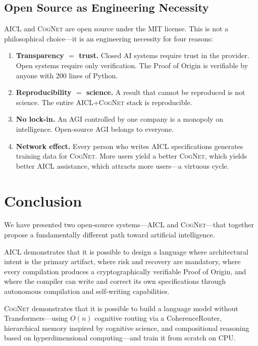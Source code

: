 \documentclass[11pt]{article}
\newcommand{\aicl}{\textsc{AICL}}
\newcommand{\cognet}{\textsc{CogNet}}
\newcommand{\proofoforigin}{Proof of Origin}
\begin{document}
\subsection{Open Source as Engineering Necessity}
\label{sec:discussion:opensource}

\aicl{} and \cognet{} are open source under the MIT license. This is not a philosophical choice---it is an engineering necessity for four reasons:
\begin{enumerate}[leftmargin=*,itemsep=2pt]
  \item \textbf{Transparency $=$ trust.} Closed AI systems require trust in the provider. Open systems require only verification. The \proofoforigin{} is verifiable by anyone with 200 lines of Python.
  \item \textbf{Reproducibility $=$ science.} A result that cannot be reproduced is not science. The entire \aicl{}+\cognet{} stack is reproducible.
  \item \textbf{No lock-in.} An AGI controlled by one company is a monopoly on intelligence. Open-source AGI belongs to everyone.
  \item \textbf{Network effect.} Every person who writes \aicl{} specifications generates training data for \cognet{}. More users yield a better \cognet{}, which yields better \aicl{} assistance, which attracts more users---a virtuous cycle.
\end{enumerate}

\section{Conclusion}
\label{sec:conclusion}

We have presented two open-source systems---\aicl{} and \cognet{}---that together propose a fundamentally different path toward artificial intelligence.

\aicl{} demonstrates that it is possible to design a language where architectural intent is the primary artifact, where risk and recovery are mandatory, where every compilation produces a cryptographically verifiable \proofoforigin{}, and where the compiler can write and correct its own specifications through autonomous compilation and self-writing capabilities.

\cognet{} demonstrates that it is possible to build a language model without Transformers---using $O(n)$ cognitive routing via a CoherenceRouter, hierarchical memory inspired by cognitive science, and compositional reasoning based on hyperdimensional computing---and train it from scratch on CPU.
\end{document}

